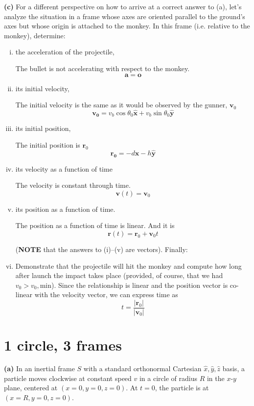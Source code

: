 \documentclass[12pt]{article}
\newcommand{\abso}[1]{\left|#1 \right|}
\newcommand{\unx}{\hat{\mathbf{x}}}
\newcommand{\uny}{\hat{\mathbf{y}}}
\begin{document}
\textbf{(c)} For a different perspective on how to arrive at a correct answer to (a), let’s analyze the situation in a frame whose axes are oriented parallel to the ground’s axes but whose origin is attached to the monkey. In this frame (i.e. relative to the monkey), determine:

\begin{enumerate}[i.]
    \item the acceleration of the projectile,

    The bullet is not accelerating with respect to the monkey.
    \[
    \mathbf{a} = \mathbf{o}
    \]
    \item its initial velocity,

    The initial velocity is the same as it would be observed by the gunner, $\mathbf{v}_0$
    \[
    \mathbf{v_0} = v_b\cos\theta_0 \unx + v_b\sin\theta_0 \uny
    \]
    \item its initial position,

    The initial position is $\mathbf{r}_0$
    \[
    \mathbf{r_0} = -d\unx -h\uny
    \]
    \item its velocity as a function of time

    The velocity is constant through time.
    \[
    \mathbf{v}(t) = \mathbf{v}_0
    \]
    \item its position as a function of time.

    The position as a function of time is linear. And it is 
    \[
    \mathbf{r}(t) = \mathbf{r}_0 + \mathbf{v}_0t
    \]


(\textbf{NOTE} that the answers to (i)–(v) are vectors). Finally:


    \item Demonstrate that the projectile will hit the monkey and compute how long after launch the impact takes place (provided, of course, that we had \(v_0 > v_0, \text{min}\)).
    Since the relationship is linear and the position vector is co-linear with the velocity vector, we can express time as
    \[
    t = \frac{\abso{\mathbf{r}_0}}{\abso{\mathbf{v}_0}}
    \]

    
\end{enumerate}


\section{1 circle, 3 frames}

\textbf{(a)} In an inertial frame \(S\) with a standard orthonormal Cartesian \(\hat{x}, \hat{y}, \hat{z}\) basis, a particle moves clockwise at constant speed \(v\) in a circle of radius \(R\) in the \(x\)-\(y\) plane, centered at \((x = 0, y = 0, z = 0)\). At \(t = 0\), the particle is at \((x = R, y = 0, z = 0)\).
\end{document}
